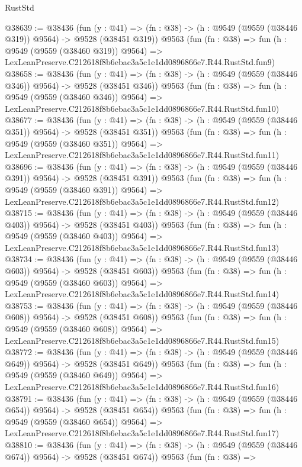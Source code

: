 \begin{lexlean}{RustStd}
\begin{coremodule}
@38639 := @38436
    (fun (y : @41) => (fn : @38) -> (h : @9549 (@9559 (@38446 @319)) @9564) -> @9528 (@38451 @319))
    @9563
    (fun (fn : @38) =>
    fun (h : @9549 (@9559 (@38460 @319)) @9564) =>
    LexLeanPreserve.C212618f8b6ebac3a5c1e1dd0896866e7.R44.RustStd.fun9)
@38658 := @38436
    (fun (y : @41) => (fn : @38) -> (h : @9549 (@9559 (@38446 @346)) @9564) -> @9528 (@38451 @346))
    @9563
    (fun (fn : @38) =>
    fun (h : @9549 (@9559 (@38460 @346)) @9564) =>
    LexLeanPreserve.C212618f8b6ebac3a5c1e1dd0896866e7.R44.RustStd.fun10)
@38677 := @38436
    (fun (y : @41) => (fn : @38) -> (h : @9549 (@9559 (@38446 @351)) @9564) -> @9528 (@38451 @351))
    @9563
    (fun (fn : @38) =>
    fun (h : @9549 (@9559 (@38460 @351)) @9564) =>
    LexLeanPreserve.C212618f8b6ebac3a5c1e1dd0896866e7.R44.RustStd.fun11)
@38696 := @38436
    (fun (y : @41) => (fn : @38) -> (h : @9549 (@9559 (@38446 @391)) @9564) -> @9528 (@38451 @391))
    @9563
    (fun (fn : @38) =>
    fun (h : @9549 (@9559 (@38460 @391)) @9564) =>
    LexLeanPreserve.C212618f8b6ebac3a5c1e1dd0896866e7.R44.RustStd.fun12)
@38715 := @38436
    (fun (y : @41) => (fn : @38) -> (h : @9549 (@9559 (@38446 @403)) @9564) -> @9528 (@38451 @403))
    @9563
    (fun (fn : @38) =>
    fun (h : @9549 (@9559 (@38460 @403)) @9564) =>
    LexLeanPreserve.C212618f8b6ebac3a5c1e1dd0896866e7.R44.RustStd.fun13)
@38734 := @38436
    (fun (y : @41) => (fn : @38) -> (h : @9549 (@9559 (@38446 @603)) @9564) -> @9528 (@38451 @603))
    @9563
    (fun (fn : @38) =>
    fun (h : @9549 (@9559 (@38460 @603)) @9564) =>
    LexLeanPreserve.C212618f8b6ebac3a5c1e1dd0896866e7.R44.RustStd.fun14)
@38753 := @38436
    (fun (y : @41) => (fn : @38) -> (h : @9549 (@9559 (@38446 @608)) @9564) -> @9528 (@38451 @608))
    @9563
    (fun (fn : @38) =>
    fun (h : @9549 (@9559 (@38460 @608)) @9564) =>
    LexLeanPreserve.C212618f8b6ebac3a5c1e1dd0896866e7.R44.RustStd.fun15)
@38772 := @38436
    (fun (y : @41) => (fn : @38) -> (h : @9549 (@9559 (@38446 @649)) @9564) -> @9528 (@38451 @649))
    @9563
    (fun (fn : @38) =>
    fun (h : @9549 (@9559 (@38460 @649)) @9564) =>
    LexLeanPreserve.C212618f8b6ebac3a5c1e1dd0896866e7.R44.RustStd.fun16)
@38791 := @38436
    (fun (y : @41) => (fn : @38) -> (h : @9549 (@9559 (@38446 @654)) @9564) -> @9528 (@38451 @654))
    @9563
    (fun (fn : @38) =>
    fun (h : @9549 (@9559 (@38460 @654)) @9564) =>
    LexLeanPreserve.C212618f8b6ebac3a5c1e1dd0896866e7.R44.RustStd.fun17)
@38810 := @38436
    (fun (y : @41) => (fn : @38) -> (h : @9549 (@9559 (@38446 @674)) @9564) -> @9528 (@38451 @674))
    @9563
    (fun (fn : @38) =>

\end{coremodule}
\end{lexlean}
